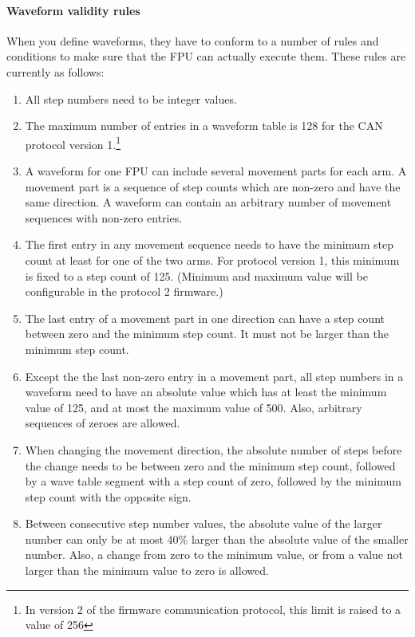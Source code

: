 \documentclass{scrartcl}[12pt,a4paper]
\begin{document}
\paragraph{Waveform validity rules}

When you define waveforms, they have to conform to a number of rules
and conditions to make sure that the FPU can actually execute
them. These rules are currently as follows:

\begin{enumerate}

\item All step numbers need to be integer values.

\item The maximum number of entries in a waveform table is 128 for the
  CAN protocol version 1.\footnote{In version 2 of the firmware
    communication protocol, this limit is raised to a value of 256}
  
\item A waveform for one FPU can include several movement parts for
  each arm. A movement part is a sequence of step counts which are
  non-zero and have the same direction.  A waveform can contain an
  arbitrary number of movement sequences with non-zero entries.

\item The first entry in any movement sequence needs to have the
  minimum step count at least for one of the two arms.  For protocol
  version 1, this minimum is fixed to a step count of 125. (Minimum
  and maximum value will be configurable in the protocol 2 firmware.)

\item The last entry of a movement part in one direction can have a
  step count between zero and the minimum step count. It must not be
  larger than the minimum step count.
  
\item Except the the last non-zero entry in a movement part, all step
  numbers in a waveform need to have an absolute value which has at
  least the minimum value of 125, and at most the maximum value of
  500. Also, arbitrary sequences of zeroes are allowed.

\item When changing the movement direction, the absolute number of
  steps before the change needs to be between zero and the minimum
  step count, followed by a wave table segment with a step count of
  zero, followed by the minimum step count with the opposite sign.

\item Between consecutive step number values, the absolute value of
  the larger number can only be at most 40\% larger than the absolute
  value of the smaller number. Also, a change from zero to the minimum
  value, or from a value not larger than the minimum value to zero is
  allowed.

  
\end{enumerate}
\end{document}
